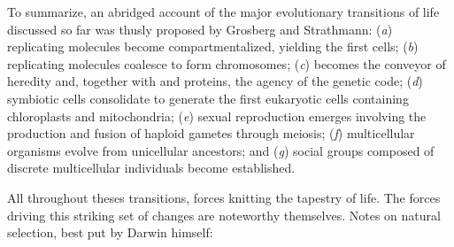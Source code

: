 \documentclass{tufte-book}
\begin{document}




To summarize, an abridged account of the major evolutionary transitions of life
discussed so far was thusly proposed by Grosberg and
Strathmann\cite{grosberg_evolution_2007}: (\emph{a}) replicating molecules
become compartmentalized, yielding the first cells; (\emph{b}) replicating
molecules coalesce to form chromosomes; (\emph{c})  becomes the
conveyor of heredity and, together with  and proteins, the agency
of the genetic code; (\emph{d}) symbiotic cells consolidate to generate the
first eukaryotic cells containing chloroplasts and mitochondria; (\emph{e})
sexual reproduction emerges involving the production and fusion of haploid
gametes through meiosis; (\emph{f}) multicellular organisms evolve from
unicellular ancestors; and (\emph{g}) social groups composed of discrete
multicellular individuals become established.

All throughout theses transitions, forces knitting the tapestry of life. The
forces driving this striking set of changes are noteworthy themselves.  Notes on
natural selection, best put by Darwin himself:

\end{document}
